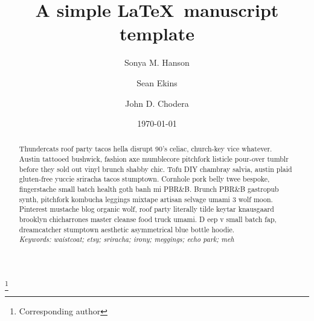 \documentclass[aps,pre,twocolumn,nofootinbib,superscriptaddress,nolinenumbers,11point]{revtex4-1}
\begin{document}

\title{A simple \LaTeX\ manuscript template}

\author{Sonya M. Hanson}
\author{Sean Ekins}
\author{John D. Chodera}
 \thanks{Corresponding author}

\date{\today}


\begin{abstract}

Thundercats roof party tacos hella disrupt 90's celiac, church-key vice whatever. 
Austin tattooed bushwick, fashion axe mumblecore pitchfork listicle pour-over tumblr before they sold out vinyl brunch shabby chic. Tofu DIY chambray salvia, austin plaid gluten-free yuccie sriracha tacos stumptown. Cornhole pork belly twee bespoke, fingerstache small batch health goth banh mi PBR\&B. 
Brunch PBR\&B gastropub synth, pitchfork kombucha leggings mixtape artisan selvage umami 3 wolf moon. Pinterest mustache blog organic wolf, roof party literally tilde keytar knausgaard brooklyn chicharrones master cleanse food truck umami. D
eep v small batch fap, dreamcatcher stumptown aesthetic asymmetrical blue bottle hoodie.\\

\emph{Keywords: waistcoat; etsy; sriracha; irony; meggings; echo park; meh}

\end{abstract}

\maketitle

\end{document}
